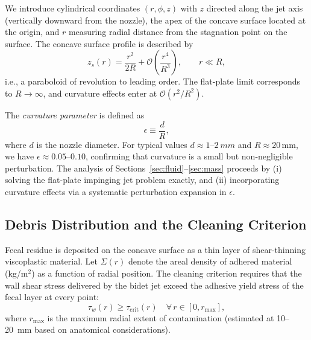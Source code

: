 \documentclass[10pt,letterpaper]{article}
\begin{document}
We introduce cylindrical coordinates $(r, \phi, z)$ with $z$ directed along
the jet axis (vertically downward from the nozzle), the apex of the concave
surface located at the origin, and $r$ measuring radial distance from the
stagnation point on the surface. The concave surface profile is described by
\begin{equation}
    z_s(r) = \frac{r^2}{2R} + \mathcal{O}\!\left(\frac{r^4}{R^3}\right),
    \qquad r \ll R,
    \label{eq:surfaceprofile}
\end{equation}
i.e., a paraboloid of revolution to leading order. The flat-plate limit
corresponds to $R \to \infty$, and curvature effects enter at
$\mathcal{O}(r^2/R^2)$.

The \emph{curvature parameter} is defined as
\begin{equation}
    \epsilon \equiv \frac{d}{R},
    \label{eq:curvparam}
\end{equation}
where $d$ is the nozzle diameter. For typical values $d \approx 1$--$2~mm$
and $R \approx 20\,\mathrm{mm}$, we have $\epsilon \approx 0.05$--$0.10$,
confirming that curvature is a small but non-negligible perturbation. The
analysis of Sections~\ref{sec:fluid}--\ref{sec:mass} proceeds by (i)
solving the flat-plate impinging jet problem exactly, and (ii) incorporating
curvature effects via a systematic perturbation expansion in $\epsilon$.

\subsection{Debris Distribution and the Cleaning Criterion}

Fecal residue is deposited on the concave surface as a thin layer of
shear-thinning viscoplastic material. Let $\Sigma(r)$ denote the areal
density of adhered material (kg/m$^2$) as a function of radial position.
The cleaning criterion requires that the wall shear stress delivered by the
bidet jet exceed the adhesive yield stress of the fecal layer at every point:
\begin{equation}
    \tau_w(r) \geq \tau_\mathrm{crit}(r) \quad \forall\, r \in [0, r_\mathrm{max}],
    \label{eq:cleaningcriterion}
\end{equation}
where $r_\mathrm{max}$ is the maximum radial extent of contamination (estimated
at 10--20~mm based on anatomical considerations).
\end{document}
